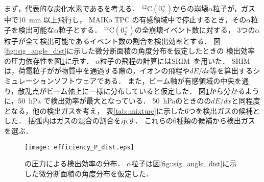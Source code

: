 \documentclass[../master]{subfiles}
\begin{document}
まず，代表的な炭化水素である\Methane を考える．
${}^{12}\mathrm{C}(0_2^+)$からの崩壊$\alpha$粒子が，ガス中で\SI{10}{\milli\metre} 以上飛行し，
MAIKo TPC の有感領域中で停止するとき，その$\alpha$粒子を検出可能な$\alpha$粒子とする．
${}^{12}\mathrm{C}(0_2^+)$の全崩壊イベント数に対する，
3つの$\alpha$粒子が全て検出可能であるイベント数の割合を検出効率とする．
図\ref{fig::sig_angle_dist}に示した微分断面積の角度分布を仮定したときの
検出効率の圧力依存性を図\ref{fig::efficiency_P_dist}に示す．
$\alpha$粒子の飛程の計算にはSRIM~\cite{SRIM}を用いた．
SRIM は，荷電粒子がが物質中を通過する際の，イオンの飛程や$dE/dx$等を算出するシミュレーションソフトウェアである．
また，ビーム軸が有感領域の中央を通り，散乱点がビーム軸上に一様に分布していると仮定した．
図\ref{fig::efficiency_P_dist}から分かるように，\SI{50}{\hecto\pascal} で検出効率が最大となっている．
\SI{50}{\hecto\pascal}のときの\Methane の$dE/dx$と同程度となる，他の検出ガスを考え，
表\ref{tab::mixture}に示した6つを検出ガスの候補とした．
括弧内はガスの混合の割合を示す．
これらの6種類の候補から検出ガスを選ぶ．
\begin{figure}
  \centering
  \texttt{[image: efficiency\_P\_dist.eps]}
  \caption[\Methane の圧力による検出効率の分布．]
          {\Methane の圧力による検出効率の分布．
            $\alpha$粒子は図\ref{fig::sig_angle_dist}に示した微分断面積の角度分布を仮定した．
           }
  \label{fig::efficiency_P_dist}
\end{figure}
\end{document}
